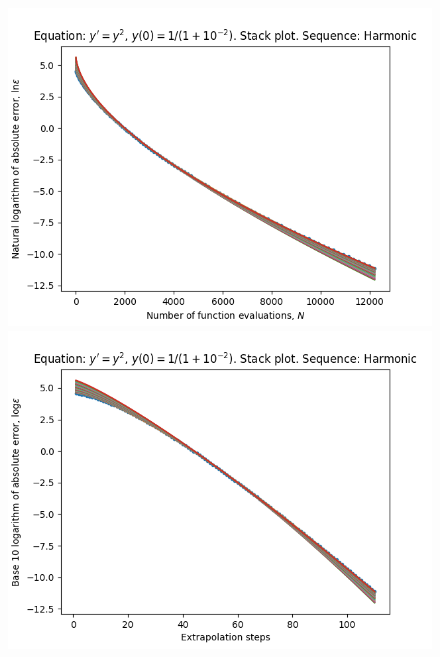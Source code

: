 \begin{figure}[H]
\centering
\begin{minipage}{0.45\textwidth}
\centering
\includegraphics[scale=0.45]{emr_plots/singularity_2_hp_harmonic_stack.png}
\end{minipage}
\begin{minipage}{0.45\textwidth}
\centering
\includegraphics[scale=0.45]{emr_plots/singularity_2_hp_harmonic_steps_stack.png}
\end{minipage}
\end{figure}

